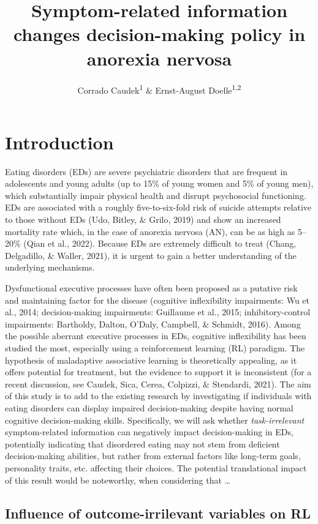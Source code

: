\documentclass[
  man,floatsintext]{apa6}
\title{Symptom-related information changes decision-making policy in anorexia nervosa}
\author{Corrado Caudek\textsuperscript{1} \& Ernst-August Doelle\textsuperscript{1,2}}
\date{}
\affiliation{\vspace{0.5cm}\textsuperscript{1} Wilhelm-Wundt-University\\\textsuperscript{2} Konstanz Business School}
\begin{document}
\maketitle

\hypertarget{introduction}{%
\section{Introduction}\label{introduction}}

Eating disorders (EDs) are severe psychiatric disorders that are frequent in adolescents and young adults (up to 15\% of young women and 5\% of young men), which substantially impair physical health and disrupt psychosocial functioning. EDs are associated with a roughly five-to-six-fold risk of suicide attempts relative to those without EDs (Udo, Bitley, \& Grilo, 2019) and show an increased mortality rate which, in the case of anorexia nervosa (AN), can be as high as 5--20\% (Qian et al., 2022). Because EDs are extremely difficult to treat (Chang, Delgadillo, \& Waller, 2021), it is urgent to gain a better understanding of the underlying mechanisms.

Dysfunctional executive processes have often been proposed as a putative risk and
maintaining factor for the disease (cognitive inflexibility impairments: Wu et al., 2014; decision-making impairments: Guillaume et al., 2015; inhibitory-control impairments: Bartholdy, Dalton, O'Daly, Campbell, \& Schmidt, 2016). Among the possible aberrant executive processes in EDs, cognitive inflexibility has been studied the most, especially using a reinforcement learning (RL) paradigm. The hypothesis of maladaptive associative learning is theoretically appealing, as it offers potential for treatment, but the evidence to support it is inconsistent (for a recent discussion, see Caudek, Sica, Cerea, Colpizzi, \& Stendardi, 2021). The aim of this study is to add to the existing research by investigating if individuals with eating disorders can display impaired decision-making despite having normal cognitive decision-making skills. Specifically, we will ask whether \emph{task-irrelevant} symptom-related information can negatively impact decision-making in EDs, potentially indicating that disordered eating may not stem from deficient decision-making abilities, but rather from external factors like long-term goals, personality traits, etc. affecting their choices. The potential translational impact of this result would be noteworthy, when considering that \ldots{}

\hypertarget{influence-of-outcome-irrilevant-variables-on-rl}{%
\subsection{Influence of outcome-irrilevant variables on RL}\label{influence-of-outcome-irrilevant-variables-on-rl}}
\end{document}
